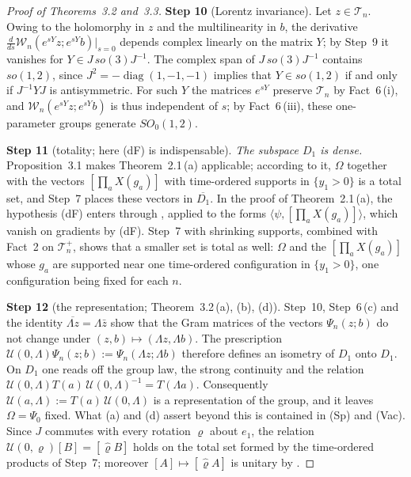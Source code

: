 \documentclass[11pt,letterpaper,reqno]{amsart}
\theoremstyle{definition}
\begin{document}
\begin{proof}[Proof of Theorems~3.2 and~3.3]
\textbf{Step 10} (Lorentz invariance).
Let $z\in\mathcal T_n$.
Owing to the holomorphy in $z$ and the multilinearity in $b$, the derivative $\frac d{ds}\mathcal W_n(e^{sY}z;e^{sY}b)|_{s=0}$ depends complex linearly on the matrix $Y$; by Step~9 it vanishes for $Y\in J\,so(3)J^{-1}$.
The complex span of $J\,so(3)J^{-1}$ contains $so(1,2)$, since $J^2=-\operatorname{diag}(1,-1,-1)$ implies that $Y\in so(1,2)$ if and only if $J^{-1}YJ$ is antisymmetric.
For such $Y$ the matrices $e^{sY}$ preserve $\mathcal T_n$ by Fact~6\,(i), and $\mathcal W_n(e^{sY}z;e^{sY}b)$ is thus independent of $s$; by Fact~6\,(iii), these one-parameter groups generate $SO_0(1,2)$.

\textbf{Step 11} (totality; here (dF) is indispensable).
\emph{The subspace $D_1$ is dense.}
Proposition~3.1 makes Theorem~2.1\,(a) applicable; according to it, $\Omega$ together with the vectors $[\prod_aX(g_a)]$ with time-ordered supports in $\{y_1>0\}$ is a total set, and Step~7 places these vectors in $\overline{D_1}$.
In the proof of Theorem~2.1\,(a), the hypothesis (dF) enters through \cite[Proposition~14.13]{QEDII}, applied to the forms $\langle\psi,[\prod_aX(g_a)]\rangle$, which vanish on gradients by (dF).
Step~7 with shrinking supports, combined with Fact~2 on $\mathcal T_n^+$, shows that a smaller set is total as well: $\Omega$ and the $[\prod_aX(g_a)]$ whose $g_a$ are supported near one time-ordered configuration in $\{y_1>0\}$, one configuration being fixed for each $n$.

\textbf{Step 12} (the representation; Theorem~3.2\,(a), (b), (d)).
Step~10, Step~6\,(c) and the identity $\overline{\Lambda z}=\Lambda\bar z$ show that the Gram matrices of the vectors $\Psi_n(z;b)$ do not change under $(z,b)\mapsto(\Lambda z,\Lambda b)$.
The prescription $\mathcal U(0,\Lambda)\Psi_n(z;b):=\Psi_n(\Lambda z;\Lambda b)$ therefore defines an isometry of $D_1$ onto $D_1$.
On $D_1$ one reads off the group law, the strong continuity and the relation $\mathcal U(0,\allowbreak \Lambda)T(a)\,\allowbreak \mathcal U(0,\allowbreak \Lambda)^{-1}=\allowbreak T(\Lambda a)$.
Consequently $\mathcal U(a,\Lambda):=T(a)\,\mathcal U(0,\Lambda)$ is a representation of the group, and it leaves $\Omega=\Psi_0$ fixed.
What (a) and (d) assert beyond this is contained in (Sp) and (Vac).
Since $J$ commutes with every rotation $\varrho$ about $e_1$, the relation $\mathcal U(0,\varrho)[B]=[\hat\varrho B]$ holds on the total set formed by the time-ordered products of Step~7; moreover $[A]\mapsto[\hat\varrho A]$ is unitary by \cite[Proposition~14.47\,(a)]{QEDII}.


\end{proof}
\end{document}
